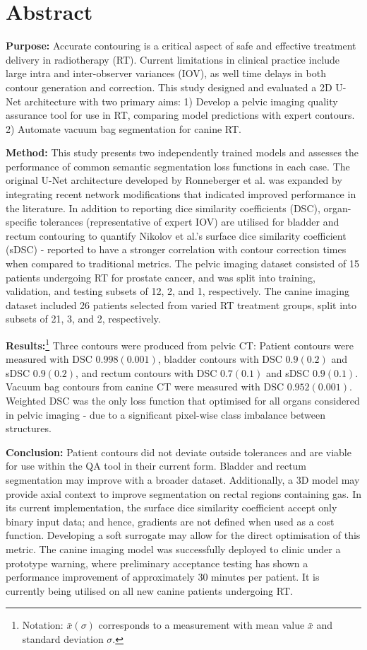 \chapter{Abstract} \label{ch:abstract}

\textbf{Purpose:} Accurate contouring is a critical aspect of safe and effective
treatment delivery in radiotherapy (RT). Current limitations in clinical
practice include large intra and inter-observer variances (IOV), as well time
delays in both contour generation and correction. This study designed and
evaluated a 2D U-Net architecture with two primary aims:
1) Develop a pelvic imaging quality assurance tool for use in
RT, comparing model predictions with expert contours. 2) Automate vacuum bag
segmentation for canine RT.

\textbf{Method:} This study presents two independently trained models and
assesses the performance of common semantic segmentation loss functions in each
case. The original U-Net architecture developed by Ronneberger et al. was
expanded by integrating recent network modifications that indicated improved
performance in the literature. In addition to reporting dice similarity
coefficients (DSC), organ-specific tolerances (representative of expert IOV) are
utilised for bladder and rectum contouring to quantify Nikolov et al.'s surface
dice similarity coefficient (sDSC) - reported to have a stronger
correlation with contour correction times when compared to traditional metrics.
The pelvic imaging dataset consisted of 15 patients undergoing RT for prostate
cancer, and was split into training, validation, and testing subsets of 12, 2,
and 1, respectively. The canine imaging dataset included 26 patients selected
from varied RT treatment groups, split into subsets of 21, 3, and 2, respectively.

\textbf{Results:}\footnote{Notation: $\bar{x}(\sigma)$ corresponds to a
measurement with mean value $\bar{x}$ and standard deviation $\sigma$.} Three
contours were produced from pelvic CT: Patient contours were measured with DSC
$0.998(0.001)$, bladder contours with DSC $0.9(0.2)$ and sDSC $0.9(0.2)$, and
rectum contours with DSC $0.7(0.1)$ and sDSC $0.9(0.1)$. Vacuum bag contours
from canine CT were measured with DSC $0.952(0.001)$. Weighted DSC was the only
loss function that optimised for all organs considered in pelvic imaging -
due to a significant pixel-wise class imbalance between structures.

\textbf{Conclusion:} Patient contours did not deviate outside tolerances and are
viable for use within the QA tool in their current form. Bladder and rectum
segmentation may improve with a broader dataset. Additionally, a 3D model may
provide axial context to improve segmentation on rectal regions containing gas.
In its current implementation, the surface dice similarity coefficient accept
only binary input data; and hence, gradients are not defined when used as a cost
function. Developing a soft surrogate may allow for the direct optimisation of
this metric. The canine imaging model was successfully deployed to clinic under
a prototype warning, where preliminary acceptance testing has shown a
performance improvement of approximately 30 minutes per patient. It is currently
being utilised on all new canine patients undergoing RT.